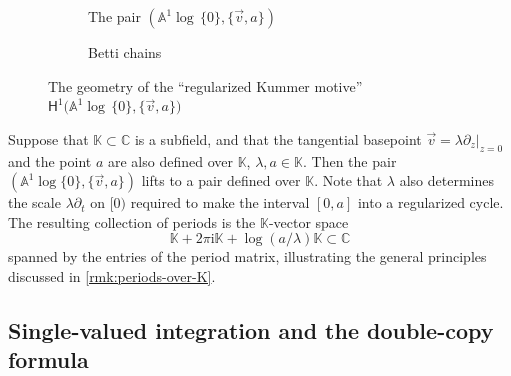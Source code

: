 \documentclass[10pt]{amsart}
\let\oldbullet\bullet
\renewcommand{\bullet}{{\raisebox{1pt}{$\scriptscriptstyle\oldbullet$}}}
\newcommand{\rbirac}[1]{\bigl(#1\bigr)}
\newcommand{\bcoH}[2][\bullet]{\mathsf{H}^{#1}\rbirac{#2}}
\theoremstyle{definition}
\theoremstyle{remark}
\newenvironment{remark}
  {\pushQED{\qed}\renewcommand{\qedsymbol}{$\lozenge$}\remarkx}
  {\popQED\endremarkx}
\newcommand{\CC}{\mathbb{C}}
\newcommand{\KK}{\mathbb{K}}
\newcommand{\AF}{\mathbb{A}}
\newcommand{\logcyl}{\AF^1 \log\, \{0\}}
\newcommand{\iu}{\mathrm{i}}
\newcommand{\ipi}{\pi\iu }
\newcommand{\tipi}{2\ipi}
\newcommand{\cvf}[1]{\partial_{#1}}
\begin{document}
\begin{figure}
\begin{subfigure}{0.4\textwidth}
\centering{}
\caption{The pair $(\logcyl,\{\vec v,a\})$}
\end{subfigure}
\begin{subfigure}{0.4\textwidth}
\caption{Betti chains}
\end{subfigure}
\caption{The geometry of the ``regularized Kummer motive''\\ $\bcoH[1]{\logcyl,\{\vec v,a\}}$}
\label{fig:Kummer-Betti}
\end{figure}

\begin{remark}\label{rmk:kummer-over-K}
Suppose that $\KK \subset \CC$ is a subfield, and that the tangential basepoint $\vec v = \lambda \cvf{z}|_{z=0}$ and the point $a$ are also defined over $\KK$, \ie $\lambda,a \in \KK$. Then the pair $(\AF^1\log \{0\},\{\vec v,a\})$ lifts to a pair defined over $\KK$. Note that $\lambda$ also determines the scale $\lambda\cvf{t}$ on $[0)$ required to make the interval $[0,a]$ into a regularized cycle. The resulting collection of periods is the $\KK$-vector space
\[
\KK + \tipi\KK + \log(a/\lambda) \KK \subset \CC
\]
spanned by the entries of the period matrix, illustrating the general principles discussed in \autoref{rmk:periods-over-K}.
\end{remark}

\subsection{Single-valued integration and the double-copy formula}
\end{document}
